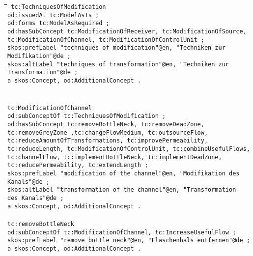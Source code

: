 \documentclass[a4paper,11pt]{article}
\newenvironment{code}{\tt \begin{tabbing}
\hskip12pt\=\hskip12pt\=\hskip12pt\=\hskip12pt\=\hskip5cm\=\hskip5cm\=\kill}
{\end{tabbing}}
\begin{document}
\begin{itemize}
    \begin{code}\tt
        tc:TechniquesOfModification \\
        \> od:issuedAt tc:ModelAsIs ; \\
        \> od:forms tc:ModelAsRequired ; \\
        \> od:hasSubConcept tc:ModificationOfReceiver, tc:ModificationOfSource, \\
        \> tc:ModificationOfChannel, tc:ModificationOfControlUnit ; \\
        \> skos:prefLabel "techniques of modification"@en, "Techniken zur  \\
        \> Modifikation"@de ; \\
        \> skos:altLabel "techniques of transformation"@en, "Techniken zur \\
        \> Transformation"@de ; \\
        \> a skos:Concept, od:AdditionalConcept . \\
        \\
        \\
        tc:ModificationOfChannel \\
        \> od:subConceptOf tc:TechniquesOfModification ; \\
        \> od:hasSubConcept tc:removeBottleNeck, tc:removeDeadZone,  \\
        \> tc:removeGreyZone ,tc:changeFlowMedium, tc:outsourceFlow,  \\
        \> tc:reduceAmountOfTransformations, tc:improvePermeability,  \\
        \> tc:reduceLength, tc:ModificationOfControlUnit, tc:combineUsefulFlows,  \\
        \> tc:channelFlow, tc:implementBottleNeck, tc:implementDeadZone,  \\
        \> tc:reducePermeability, tc:extendLength ; \\
        \> skos:prefLabel "modification of the channel"@en, "Modifikation des  \\
        \> Kanals"@de ; \\
        \> skos:altLabel "transformation of the channel"@en, "Transformation  \\
        \> des Kanals"@de ; \\
        \> a skos:Concept, od:AdditionalConcept . \\
        \\
        tc:removeBottleNeck \\
        \> od:subConceptOf tc:ModificationOfChannel, tc:IncreaseUsefulFlow ; \\
        \> skos:prefLabel "remove bottle neck"@en, "Flaschenhals entfernen"@de ; \\
        \> a skos:Concept, od:AdditionalConcept . \\
        \end{code}


\end{itemize}
\end{document}

